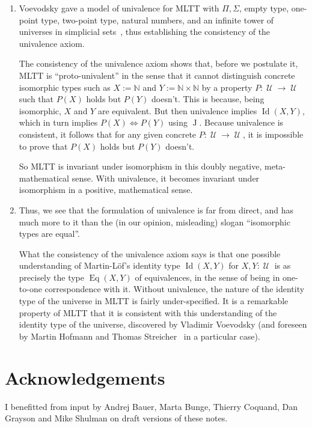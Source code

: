 \documentclass{article}
\newcommand{\N}{\mathbb{N}}
\newcommand{\Id}{\operatorname{Id}}
\newcommand{\J}{\operatorname{J}}
\newcommand{\U}{\operatorname{\mathcal{U}}}
\newcommand{\Eq}{\operatorname{Eq}}
\begin{document}
\begin{enumerate}
  \item Voevodsky gave a model of univalence for MLTT with
    $\Pi,\Sigma$, empty type, one-point type, two-point type, natural
    numbers, and an infinite tower of universes in simplicial
    sets~\cite{kapulkin:lumsdaine:voevodsky,kapulkin:lumsdaine}, thus
    establishing the consistency of the univalence axiom.
    
    The consistency of the univalence axiom shows that, before we
    postulate it, MLTT is ``proto-univalent'' in the sense that it
    cannot distinguish concrete isomorphic types such as $X:=\N$ and
    $Y:=\N\times \N$ by a property $P:\U\to \U$ such that $P(X)$ holds
    but $P(Y)$ doesn't.  This is because, being isomorphic, $X$ and
    $Y$ are equivalent. But then univalence implies $\Id(X,Y)$, which
    in turn implies $P(X) \iff P(Y)$ using $\J$.  Because univalence
    is consistent, it follows that for any given concrete
    $P:\U\to \U$, it is impossible to prove that $P(X)$ holds but
    $P(Y)$ doesn't.

    So MLTT is invariant under isomorphism in this doubly negative,
    meta-mathematical sense. With univalence, it becomes invariant
    under isomorphism in a positive, mathematical sense.

 \item Thus, we see that the formulation of univalence is far from
    direct, and has much more to it than the (in our opinion,
    misleading) slogan ``isomorphic types are equal''.

    What the consistency of the univalence axiom says is that one
    possible understanding of Martin-L\"of's identity type $\Id(X,Y)$ for
    $X,Y:\U$ is as precisely the type $\Eq(X,Y)$ of equivalences, in
    the sense of being in one-to-one correspondence with it. Without
    univalence, the nature of the identity type of the universe in
    MLTT is fairly under-specified. It is a remarkable property of
    MLTT that it is consistent with this understanding of the identity
    type of the universe, discovered by Vladimir Voevodsky (and
    foreseen by Martin Hofmann and Thomas Streicher~\cite{MR1686862}
    in a particular case).
  \end{enumerate}

  \section*{Acknowledgements}

  I benefitted from input by Andrej Bauer, Marta Bunge, Thierry
  Coquand, Dan Grayson and Mike Shulman on draft versions of these
  notes.
  


\end{document}

